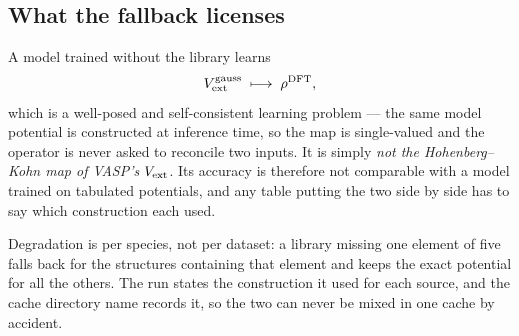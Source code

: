 \subsection{What the fallback licenses}

A model trained without the library learns
\begin{equation}
  V_{\mathrm{ext}}^{\mathrm{gauss}} \;\longmapsto\; \rho^{\mathrm{DFT}} ,
\end{equation}
which is a well-posed and self-consistent learning problem --- the same model
potential is constructed at inference time, so the map is single-valued and the
operator is never asked to reconcile two inputs. It is simply \emph{not the
Hohenberg--Kohn map of VASP's} $V_{\mathrm{ext}}$. Its accuracy is therefore not
comparable with a model trained on tabulated potentials, and any table putting
the two side by side has to say which construction each used.

Degradation is per species, not per dataset: a library missing one element of
five falls back for the structures containing that element and keeps the exact
potential for all the others. The run states the construction it used for each
source, and the cache directory name records it, so the two can never be mixed
in one cache by accident.
